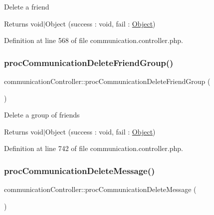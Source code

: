 Delete a friend \begin{DoxyReturn}{Returns}
void$\vert$\+Object (success \+: void, fail \+: \hyperlink{classObject}{Object}) 
\end{DoxyReturn}


Definition at line 568 of file communication.\+controller.\+php.

\mbox{\label{classcommunicationController_ab09ca02f677729eb87ca2b3671d54621}} 
\subsubsection{\texorpdfstring{proc\+Communication\+Delete\+Friend\+Group()}{procCommunicationDeleteFriendGroup()}}
{\footnotesize\ttfamily communication\+Controller\+::proc\+Communication\+Delete\+Friend\+Group (\begin{DoxyParamCaption}{ }\end{DoxyParamCaption})}

Delete a group of friends \begin{DoxyReturn}{Returns}
void$\vert$\+Object (success \+: void, fail \+: \hyperlink{classObject}{Object}) 
\end{DoxyReturn}


Definition at line 742 of file communication.\+controller.\+php.

\mbox{\label{classcommunicationController_a48f939eabc293aae65e4285b5ebb35c5}} 
\subsubsection{\texorpdfstring{proc\+Communication\+Delete\+Message()}{procCommunicationDeleteMessage()}}
{\footnotesize\ttfamily communication\+Controller\+::proc\+Communication\+Delete\+Message (\begin{DoxyParamCaption}{ }\end{DoxyParamCaption})}


